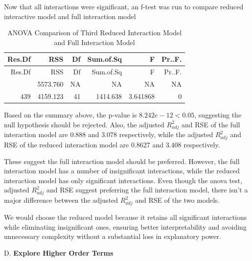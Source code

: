 \documentclass[
]{article}
\begin{document}
Now that all interactions were significant, an f-test was run to compare
reduced interactive model and full interaction model

\begin{longtable}[]{@{}rrrrrr@{}}
\caption{ANOVA Comparison of Third Reduced Interaction Model and Full
Interaction Model}\tabularnewline
\toprule\noalign{}
Res.Df & RSS & Df & Sum.of.Sq & F & Pr..F. \\
\midrule\noalign{}
\endfirsthead
\toprule\noalign{}
Res.Df & RSS & Df & Sum.of.Sq & F & Pr..F. \\
\midrule\noalign{}
\endhead
\bottomrule\noalign{}
\endlastfoot
480 & 5573.760 & NA & NA & NA & NA \\
439 & 4159.123 & 41 & 1414.638 & 3.641868 & 0 \\
\end{longtable}

Based on the summary above, the p-value is \(8.242e-12<0.05\),
suggesting the null hypothesis should be rejected. Also, the adjusted
\(R^2_{adj}\) and RSE of the full interaction model are 0.888 and 3.078
respectively, while the adjusted \(R^2_{adj}\) and RSE of the reduced
interaction model are 0.8627 and 3.408 respectively.

These suggest the full interaction model should be preferred. However,
the full interaction model has a number of insignificant interactions,
while the reduced interaction model has only significant interactions.
Even though the anova test, adjusted \(R^2_{adj}\) and RSE suggest
preferring the full interaction model, there isn't a major difference
between the adjusted \(R^2_{adj}\) and RSE of the two models.

We would choose the reduced model because it retains all significant
interactions while eliminating insignificant ones, ensuring better
interpretability and avoiding unnecessary complexity without a
substantial loss in explanatory power.

\hfill\break
\hfill\break
\hfill\break
\hfill\break

\hfill\break
\hfill\break
\hfill\break
\hfill\break

\hfill\break
\hfill\break
\hfill\break
\hfill\break

\hfill\break
\hfill\break
\hfill\break

\hfill\break
\hfill\break
\hfill\break

\hfill\break
\hfill\break
\hfill\break

D. \textbf{Explore Higher Order Terms}
\end{document}
